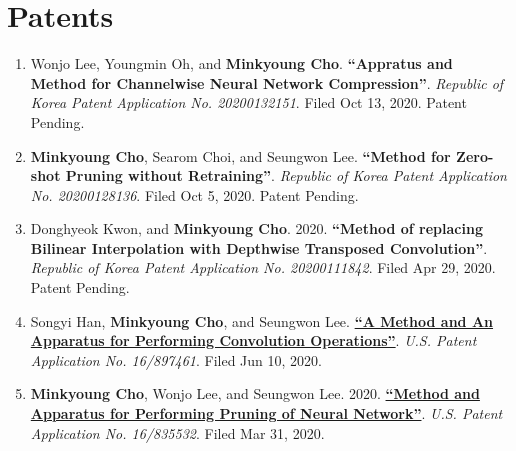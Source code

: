 \documentclass[letterpaper,oneside,11pt]{article}
\begin{document}
\section{Patents}
\begin{enumerate}[leftmargin=*, itemsep=0em]
  \item \small Wonjo Lee, Youngmin Oh, and \textbf{Minkyoung Cho}. \textbf{``Appratus and Method for Channelwise Neural Network Compression''}. \textit{Republic of Korea Patent Application No. 20200132151}. Filed Oct 13, 2020. Patent Pending.
  \item \small \textbf{Minkyoung Cho}, Searom Choi, and Seungwon Lee. \textbf{``Method for Zero-shot Pruning without Retraining''}. \textit{Republic of Korea Patent Application No. 20200128136}. Filed Oct 5, 2020. Patent Pending.
  \item \small Donghyeok Kwon, and \textbf{Minkyoung Cho}. 2020. \textbf{``Method of replacing Bilinear Interpolation with Depthwise Transposed Convolution''}. \textit{Republic of Korea Patent Application No. 20200111842}. Filed Apr 29, 2020. Patent Pending.
  \item \small Songyi Han, \textbf{Minkyoung Cho}, and Seungwon Lee. \textbf{\href{https://patents.google.com/patent/KR20210082970A/en?inventor=minkyoung+cho&assignee=samsung&oq=minkyoung+cho+samsung}{``A Method and An Apparatus for Performing Convolution Operations''}}. \textit{U.S. Patent Application No. 16/897461}. Filed Jun 10, 2020.
  \item \small \textbf{Minkyoung Cho}, Wonjo Lee, and Seungwon Lee. 2020. \textbf{\href{https://patents.google.com/patent/KR20210032140A/en?inventor=minkyoung+cho&assignee=samsung&oq=minkyoung+cho+samsung}{``Method and Apparatus for Performing Pruning of Neural Network''}}. \textit{U.S. Patent Application No. 16/835532}. Filed Mar 31, 2020.
\end{enumerate}

\end{document}
